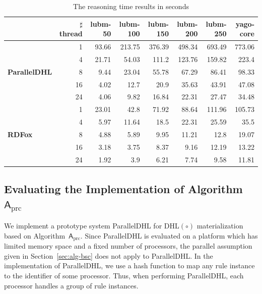\begin{table}
\centering
\caption{The reasoning time results in seconds}
{\setlength{\tabcolsep}{1.5mm}
\begin{tabular}{|l|r|r|r|r|r|r|r|}
\hline
&\small$\sharp$thread&lubm-50&lubm-100&lubm-150&lubm-200&lubm-250&yago-core\\
\hline
\multirow{5}{*}{ \small{\textbf{ParallelDHL}}}&1&93.66&213.75&376.39&498.34&693.49&773.06\\
                    &4&21.71&54.03&111.2&123.76&159.82&223.4\\
                    &8&9.44&23.04&55.78&67.29&86.41&98.33\\
                    &16&4.02&12.7&20.9&35.63&43.91&47.08\\
                    &24&4.06&9.82&16.84&22.31&27.47&34.48\\
\hline
\multirow{5}{*}{ \small{\textbf{RDFox}}}&1&23.01&42.8&71.92&88.64&111.96&105.73\\
                    &4&5.97&11.64&18.5&22.31&25.59&35.5\\
                    &8&4.88&5.89&9.95&11.21&12.8&19.07\\
                    &16&3.18&3.75&8.37&9.16&12.19&13.22\\
                    &24&1.92&3.9&6.21&7.74&9.58&11.81\\
\hline
\end{tabular}}
\label{tab:result}
\end{table}


\subsection{Evaluating the Implementation of Algorithm~$\mathsf{A}_{\text{prc}}$}

We implement a prototype system ParallelDHL for DHL$(\circ)$ materialization
based on Algorithm~$\mathsf{A}_{\text{prc}}$. Since ParallelDHL is
evaluated on a
platform which has limited memory space and a fixed number of processors,
the parallel assumption given in Section~\ref{sec:alg-bsc} does not apply to ParallelDHL.
In the implementation of ParallelDHL, we use a hash function to map any rule instance
to the identifier of some processor. Thus, when performing ParallelDHL,
each processor handles a group of rule instances.

